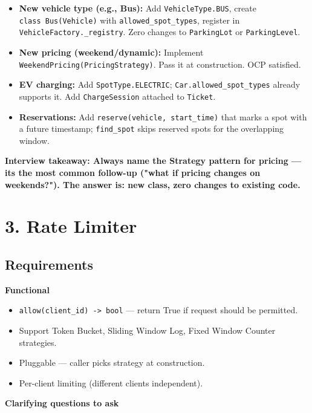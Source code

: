 \documentclass[11pt]{article}
\providecommand{\tightlist}{\setlength{\itemsep}{1pt}\setlength{\parskip}{0pt}}
\begin{document}
\begin{itemize}
\tightlist
\item
  \textbf{New vehicle type (e.g., Bus):} Add \texttt{VehicleType.BUS}, create \texttt{class\ Bus(Vehicle)} with \texttt{allowed\_spot\_types}, register in \texttt{VehicleFactory.\_registry}. Zero changes to \texttt{ParkingLot} or \texttt{ParkingLevel}.
\item
  \textbf{New pricing (weekend/dynamic):} Implement \texttt{WeekendPricing(PricingStrategy)}. Pass it at construction. OCP satisfied.
\item
  \textbf{EV charging:} Add \texttt{SpotType.ELECTRIC}; \texttt{Car.allowed\_spot\_types} already supports it. Add \texttt{ChargeSession} attached to \texttt{Ticket}.
\item
  \textbf{Reservations:} Add \texttt{reserve(vehicle,\ start\_time)} that marks a spot with a future timestamp; \texttt{find\_spot} skips reserved spots for the overlapping window.
\end{itemize}

\textbf{Interview takeaway: Always name the Strategy pattern for pricing --- it\textquotesingle s the most common follow-up ("what if pricing changes on weekends?"). The answer is: new class, zero changes to existing code.}

\section{3. Rate Limiter}\label{3-rate-limiter}

\subsection{Requirements}\label{requirements-2}

\textbf{Functional}

\begin{itemize}
\tightlist
\item
  \texttt{allow(client\_id)\ -\textgreater{}\ bool} --- return True if request should be permitted.
\item
  Support Token Bucket, Sliding Window Log, Fixed Window Counter strategies.
\item
  Pluggable --- caller picks strategy at construction.
\item
  Per-client limiting (different clients independent).
\end{itemize}

\textbf{Clarifying questions to ask}
\end{document}

